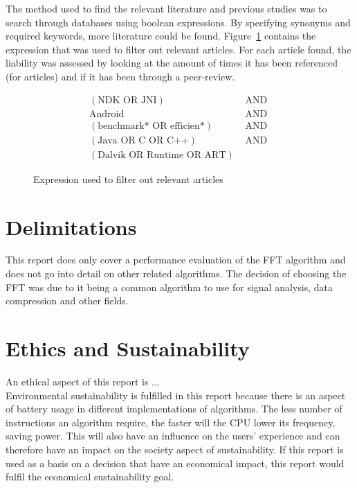 The method used to find the relevant literature and previous studies was to search through databases using boolean expressions. By specifying synonyms and required keywords, more literature could be found. Figure~\ref{fig:db:search} contains the expression that was used to filter out relevant articles. For each article found, the liability was assessed by looking at the amount of times it has been referenced (for articles) and if it has been through a peer-review.

\begin{figure}
    \centering
    \begin{align*}
        (\text{NDK OR JNI})               & \text{ AND } \\
        \text{Android}                    & \text{ AND } \\
        (\text{benchmark* OR efficien*})  & \text{ AND } \\
        (\text{Java OR C OR C++})         & \text{ AND } \\
        (\text{Dalvik OR Runtime OR ART}) &
    \end{align*}
    \caption{Expression used to filter out relevant articles}
    \label{fig:db:search}
\end{figure}


\section{Delimitations}
This report does only cover a performance evaluation of the FFT algorithm and does not go into detail on other related algorithms. The decision of choosing the FFT was due to it being a common algorithm to use for signal analysis, data compression and other fields.

\section{Ethics and Sustainability}
An ethical aspect of this report is ...\\

Environmental sustainability is fulfilled in this report because there is an aspect of battery usage in different implementations of algorithms. The less number of instructions an algorithm require, the faster will the CPU lower its frequency, saving power. This will also have an influence on the users' experience and can therefore have an impact on the society aspect of sustainability. If this report is used as a basis on a decision that have an economical impact, this report would fulfil the economical sustainability goal.

